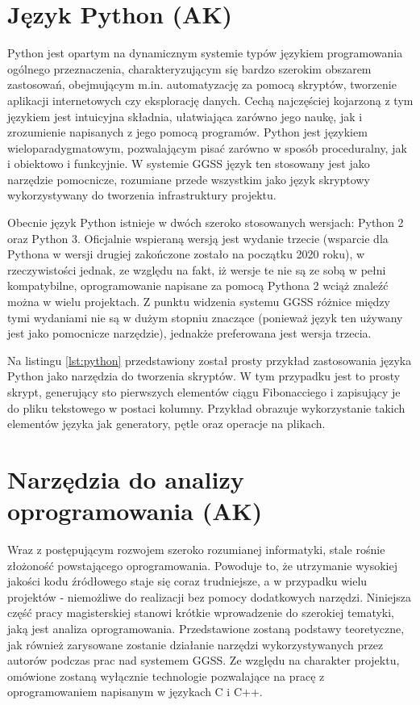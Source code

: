 \section{Język Python (AK)}
Python jest opartym na dynamicznym systemie typów językiem programowania ogólnego przeznaczenia, charakteryzującym się bardzo szerokim obszarem zastosowań, obejmującym m.in. automatyzację za pomocą skryptów, tworzenie aplikacji internetowych czy eksplorację danych. Cechą najczęściej kojarzoną z tym językiem jest intuicyjna składnia, ułatwiająca zarówno jego naukę, jak i zrozumienie napisanych z jego pomocą programów. Python jest językiem wieloparadygmatowym, pozwalającym pisać zarówno w sposób proceduralny, jak i obiektowo i funkcyjnie. W systemie GGSS język ten stosowany jest jako narzędzie pomocnicze, rozumiane przede wszystkim jako język skryptowy wykorzystywany do tworzenia infrastruktury projektu.

Obecnie język Python istnieje w dwóch szeroko stosowanych wersjach: Python 2 oraz Python 3. Oficjalnie wspieraną wersją jest wydanie trzecie (wsparcie dla Pythona w wersji drugiej zakończone zostało na początku 2020 roku), w rzeczywistości jednak, ze względu na fakt, iż wersje te nie są ze sobą w pełni kompatybilne, oprogramowanie napisane za pomocą Pythona 2 wciąż znaleźć można w wielu projektach. Z punktu widzenia systemu GGSS różnice między tymi wydaniami nie są w dużym stopniu znaczące (ponieważ język ten używany jest jako pomocnicze narzędzie), jednakże preferowana jest wersja trzecia.

Na listingu \ref{lst:python} przedstawiony został prosty przykład zastosowania języka Python jako narzędzia do tworzenia skryptów. W tym przypadku jest to prosty skrypt, generujący sto pierwszych elementów ciągu Fibonacciego i zapisujący je do pliku tekstowego w postaci kolumny. Przykład obrazuje wykorzystanie takich elementów języka jak generatory, pętle oraz operacje na plikach.





\section{Narzędzia do analizy oprogramowania (AK)}
Wraz z postępującym rozwojem szeroko rozumianej informatyki, stale rośnie złożoność powstającego oprogramowania. Powoduje to, że utrzymanie wysokiej jakości kodu źródłowego staje się coraz trudniejsze, a w przypadku wielu projektów - niemożliwe do realizacji bez pomocy dodatkowych narzędzi. Niniejsza część pracy magisterskiej stanowi krótkie wprowadzenie do szerokiej tematyki, jaką jest analiza oprogramowania. Przedstawione zostaną podstawy teoretyczne, jak również zarysowane zostanie działanie narzędzi wykorzystywanych przez autorów podczas prac nad systemem GGSS. Ze względu na charakter projektu, omówione zostaną wyłącznie technologie pozwalające na pracę z oprogramowaniem napisanym w językach C i C++. 

